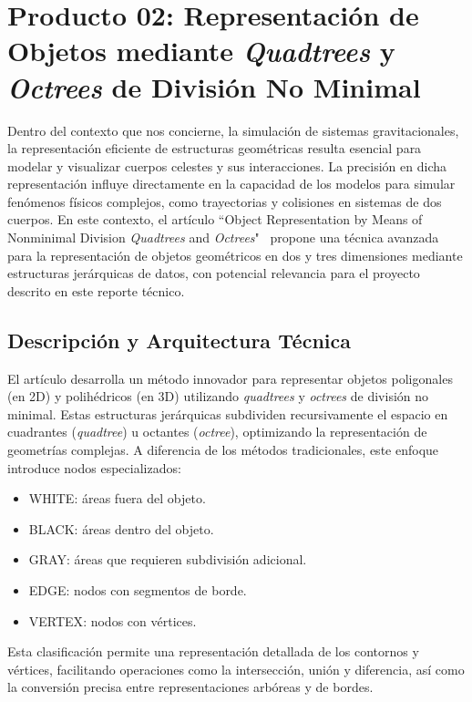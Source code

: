\section[Representación de Objetos]{Producto 02: Representación de Objetos mediante \textit{Quadtrees} y \textit{Octrees} de División No Minimal}\label{sec:object_representation}

Dentro del contexto que nos concierne, la simulación de sistemas gravitacionales, la representación eficiente de estructuras geométricas resulta esencial para modelar y visualizar cuerpos celestes y sus interacciones. La precisión en dicha representación influye directamente en la capacidad de los modelos para simular fenómenos físicos complejos, como trayectorias y colisiones en sistemas de dos cuerpos. En este contexto, el artículo ``Object Representation by Means of Nonminimal Division \textit{Quadtrees} and \textit{Octrees}"~\cite{Ayala1985} propone una técnica avanzada para la representación de objetos geométricos en dos y tres dimensiones mediante estructuras jerárquicas de datos, con potencial relevancia para el proyecto descrito en este reporte técnico.

\subsection{Descripción y Arquitectura Técnica}

El artículo desarrolla un método innovador para representar objetos poligonales (en 2D) y polihédricos (en 3D) utilizando \textit{quadtrees} y \textit{octrees} de división no minimal. Estas estructuras jerárquicas subdividen recursivamente el espacio en cuadrantes (\textit{quadtree}) u octantes (\textit{octree}), optimizando la representación de geometrías complejas. A diferencia de los métodos tradicionales, este enfoque introduce nodos especializados: 
\begin{itemize}
    \item \textsc{WHITE}: áreas fuera del objeto. 
    \item \textsc{BLACK}: áreas dentro del objeto.
    \item \textsc{GRAY}: áreas que requieren subdivisión adicional. 
    \item \textsc{EDGE}: nodos con segmentos de borde.
    \item \textsc{VERTEX}: nodos con vértices. 
\end{itemize}
Esta clasificación permite una representación detallada de los contornos y vértices, facilitando operaciones como la intersección, unión y diferencia, así como la conversión precisa entre representaciones arbóreas y de bordes.

